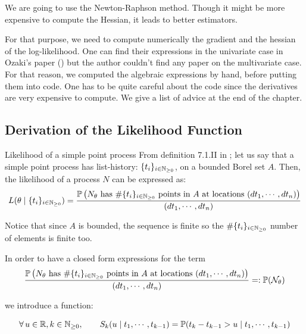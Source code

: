 \documentclass[11pt]{book}
\newcommand{\sequence}[1]{\{ #1 \}_{ i \in \N} }
\begin{document}
We are going to use the Newton-Raphson method. Though it might be more expensive to compute the Hessian, it leads to better estimators.


For that purpose, we need to compute numerically the gradient and the hessian of the log-likelihood. One can find their expressions in the univariate case in Ozaki's paper (\cite{Ozaki}) but the author couldn't find any paper on the multivariate case. For that reason, we computed the algebraic expressions by hand, before putting them into code. One has to be quite careful about the code since the derivatives are very expensive to compute. We give a list of advice at the end of the chapter.





\subsection{Derivation of the Likelihood Function}
\begin{theoreme}{Likelihood of a simple point process}
From definition 7.1.II in \cite{daley}; let us say that a simple point process has list-history: $\sequence{ t_i }$, on a bounded Borel set $A$. Then, the likelihood of a process $N$ can be expressed as:
\begin{equation}
L( \theta \mid \sequence{t_i} ) =  \frac{\mathbb P \left (N_{\theta}  \text{ has } \# \sequence{t_i} \text{ points in } A \text{ at locations  } (d t_1, \cdots, d t_n) \right ) } {(d t_1, \cdots, d t_n)}
\end{equation}

Notice that since $A$ is bounded, the sequence is finite so the $\#\sequence{t_i}$ number of elements is finite too. 
\end{theoreme}




In order to have a closed form expressions for the term $$\frac{\mathbb P \left (N_{\theta}  \text{ has } \# \sequence{t_i} \text{ points in } A \text{ at locations  } (d t_1, \cdots, d t_n) \right ) } {(d t_1, \cdots, d t_n)}  =: \mathbb P ( \mathcal N_{\theta} ) $$

we introduce a function:
\begin{definition}
\begin{equation}
\forall u \in \R, k \in \N, \qquad S_k ( u \mid t_1, \cdots, t_{k-1} ) = \mathbb P ( t_k - t_{k-1} > u \mid t_1, \cdots, t_{k-1} ) 
\end{equation}
\end{definition}
\end{document}
